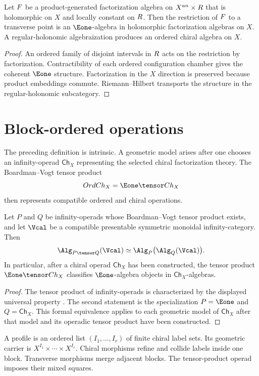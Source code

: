 \begin{theorem}
Let $F$ be a product-generated factorization algebra on $X^{an}\times R$ that is holomorphic on $X$ and locally constant on $R$. Then the restriction of $F$ to a transverse point is an $\Eone$-algebra in holomorphic factorization algebras on $X$. A regular-holonomic algebraization produces an ordered chiral algebra on $X$.
\end{theorem}
\begin{proof}
An ordered family of disjoint intervals in $R$ acts on the restriction by factorization. Contractibility of each ordered configuration chamber gives the coherent $\Eone$ structure. Factorization in the $X$ direction is preserved because product embeddings commute. Riemann--Hilbert transports the structure in the regular-holonomic subcategory.
\end{proof}

\chapter{Block-ordered operations}
The preceding definition is intrinsic. A geometric model arises after one chooses an infinity-operad $\mathsf{Ch}_X$ representing the selected chiral factorization theory. The Boardman--Vogt tensor product
\[
 \mathsf{OrdCh}_X=\Eone\tensor\mathsf{Ch}_X
\]
then represents compatible ordered and chiral operations.

\begin{theorem}
Let $P$ and $Q$ be infinity-operads whose Boardman--Vogt tensor product exists, and let $\Vcal$ be a compatible presentable symmetric monoidal infinity-category.  Then
\[
 \Alg_{P\tensor Q}(\Vcal)
 \simeq
 \Alg_P\bigl(\Alg_Q(\Vcal)\bigr).
\]
In particular, after a chiral operad $\mathsf{Ch}_X$ has been constructed, the tensor product $\Eone\tensor\mathsf{Ch}_X$ classifies $\Eone$-algebra objects in $\mathsf{Ch}_X$-algebras.
\end{theorem}
\begin{proof}
The tensor product of infinity-operads is characterized by the displayed universal property \cite{LurieHA}.  The second statement is the specialization $P=\Eone$ and $Q=\mathsf{Ch}_X$.  This formal equivalence applies to each geometric model of $\mathsf{Ch}_X$ after that model and its operadic tensor product have been constructed.
\end{proof}

A profile is an ordered list $(I_1,\ldots,I_r)$ of finite chiral label sets. Its geometric carrier is $X^{I_1}\times\cdots\times X^{I_r}$. Chiral morphisms refine and collide labels inside one block. Transverse morphisms merge adjacent blocks. The tensor-product operad imposes their mixed squares.

